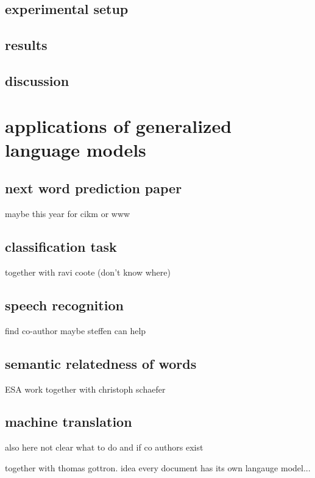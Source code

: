 \documentclass[•]{book}
\begin{document}
\section{experimental setup}
\section{results}
\section{discussion}

\chapter{applications of generalized language models}
\section{next word prediction paper}
maybe this year for cikm or www

\section{classification task}
together with ravi coote (don't know where)

\section{speech recognition}
find co-author maybe steffen can help

\section{semantic relatedness of words}
ESA work together with christoph schaefer

\section{machine translation}
also here not clear what to do and if co authors exist

together with thomas gottron. idea every document has its own langauge model...
\end{document}

